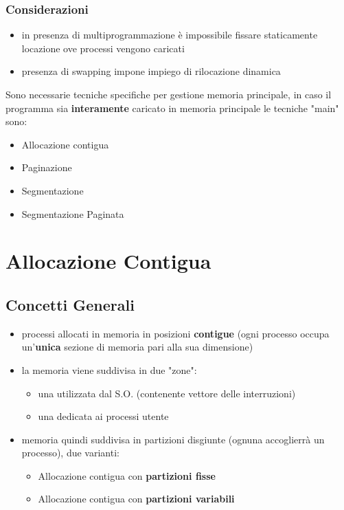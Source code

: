 \documentclass{article}
\begin{document}
\subsubsection{Considerazioni}
\begin{itemize}
    \item in presenza di multiprogrammazione è impossibile fissare staticamente locazione ove processi vengono caricati
    \item presenza di swapping impone impiego di rilocazione dinamica
\end{itemize}
Sono necessarie tecniche specifiche per gestione memoria principale, in caso il programma sia \textbf{interamente} caricato in memoria principale le tecniche "main" sono:
\begin{itemize}
    \item Allocazione contigua
    \item Paginazione 
    \item Segmentazione
    \item Segmentazione Paginata
\end{itemize}
\section{Allocazione Contigua}
\subsection{Concetti Generali}
\begin{itemize}
    \item processi allocati in memoria in posizioni \textbf{contigue} (ogni processo occupa un'\textbf{unica} sezione di memoria pari alla sua dimensione)
    \item la memoria viene suddivisa in due "zone":
        \begin{itemize}
            \item una utilizzata dal S.O. (contenente vettore delle interruzioni)
            \item una dedicata ai processi utente
        \end{itemize}
    \item memoria quindi suddivisa in partizioni disgiunte (ognuna accoglierrà un processo), due varianti:
        \begin{itemize}
            \item Allocazione contigua con \textbf{partizioni fisse}
            \item Allocazione contigua con \textbf{partizioni variabili}
        \end{itemize}
\end{itemize}
\end{document}
